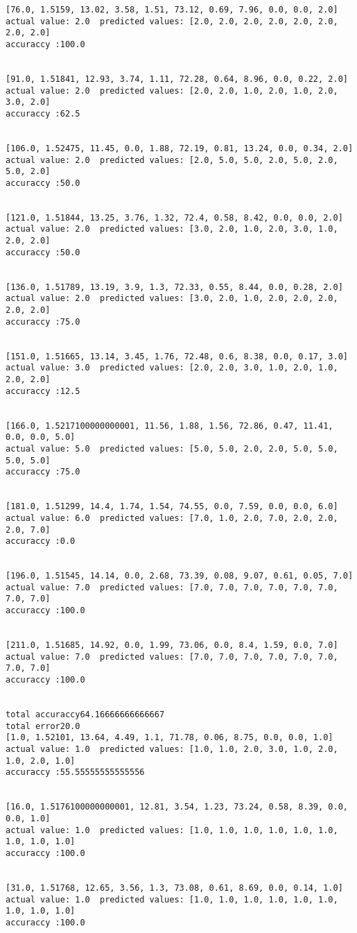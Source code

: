 \documentclass[11pt]{article}
\begin{document}
\begin{Verbatim}[commandchars=\\\{\}]
[76.0, 1.5159, 13.02, 3.58, 1.51, 73.12, 0.69, 7.96, 0.0, 0.0, 2.0]
actual value: 2.0  predicted values: [2.0, 2.0, 2.0, 2.0, 2.0, 2.0, 2.0, 2.0]
accuraccy :100.0


[91.0, 1.51841, 12.93, 3.74, 1.11, 72.28, 0.64, 8.96, 0.0, 0.22, 2.0]
actual value: 2.0  predicted values: [2.0, 2.0, 1.0, 2.0, 1.0, 2.0, 3.0, 2.0]
accuraccy :62.5


[106.0, 1.52475, 11.45, 0.0, 1.88, 72.19, 0.81, 13.24, 0.0, 0.34, 2.0]
actual value: 2.0  predicted values: [2.0, 5.0, 5.0, 2.0, 5.0, 2.0, 5.0, 2.0]
accuraccy :50.0


[121.0, 1.51844, 13.25, 3.76, 1.32, 72.4, 0.58, 8.42, 0.0, 0.0, 2.0]
actual value: 2.0  predicted values: [3.0, 2.0, 1.0, 2.0, 3.0, 1.0, 2.0, 2.0]
accuraccy :50.0


[136.0, 1.51789, 13.19, 3.9, 1.3, 72.33, 0.55, 8.44, 0.0, 0.28, 2.0]
actual value: 2.0  predicted values: [3.0, 2.0, 1.0, 2.0, 2.0, 2.0, 2.0, 2.0]
accuraccy :75.0


[151.0, 1.51665, 13.14, 3.45, 1.76, 72.48, 0.6, 8.38, 0.0, 0.17, 3.0]
actual value: 3.0  predicted values: [2.0, 2.0, 3.0, 1.0, 2.0, 1.0, 2.0, 2.0]
accuraccy :12.5


[166.0, 1.5217100000000001, 11.56, 1.88, 1.56, 72.86, 0.47, 11.41, 0.0, 0.0, 5.0]
actual value: 5.0  predicted values: [5.0, 5.0, 2.0, 2.0, 5.0, 5.0, 5.0, 5.0]
accuraccy :75.0


[181.0, 1.51299, 14.4, 1.74, 1.54, 74.55, 0.0, 7.59, 0.0, 0.0, 6.0]
actual value: 6.0  predicted values: [7.0, 1.0, 2.0, 7.0, 2.0, 2.0, 2.0, 7.0]
accuraccy :0.0


[196.0, 1.51545, 14.14, 0.0, 2.68, 73.39, 0.08, 9.07, 0.61, 0.05, 7.0]
actual value: 7.0  predicted values: [7.0, 7.0, 7.0, 7.0, 7.0, 7.0, 7.0, 7.0]
accuraccy :100.0


[211.0, 1.51685, 14.92, 0.0, 1.99, 73.06, 0.0, 8.4, 1.59, 0.0, 7.0]
actual value: 7.0  predicted values: [7.0, 7.0, 7.0, 7.0, 7.0, 7.0, 7.0, 7.0]
accuraccy :100.0


total accuraccy64.16666666666667
total error20.0
[1.0, 1.52101, 13.64, 4.49, 1.1, 71.78, 0.06, 8.75, 0.0, 0.0, 1.0]
actual value: 1.0  predicted values: [1.0, 1.0, 2.0, 3.0, 1.0, 2.0, 1.0, 2.0, 1.0]
accuraccy :55.55555555555556


[16.0, 1.5176100000000001, 12.81, 3.54, 1.23, 73.24, 0.58, 8.39, 0.0, 0.0, 1.0]
actual value: 1.0  predicted values: [1.0, 1.0, 1.0, 1.0, 1.0, 1.0, 1.0, 1.0, 1.0]
accuraccy :100.0


[31.0, 1.51768, 12.65, 3.56, 1.3, 73.08, 0.61, 8.69, 0.0, 0.14, 1.0]
actual value: 1.0  predicted values: [1.0, 1.0, 1.0, 1.0, 1.0, 1.0, 1.0, 1.0, 1.0]
accuraccy :100.0



\end{Verbatim}
\end{document}
